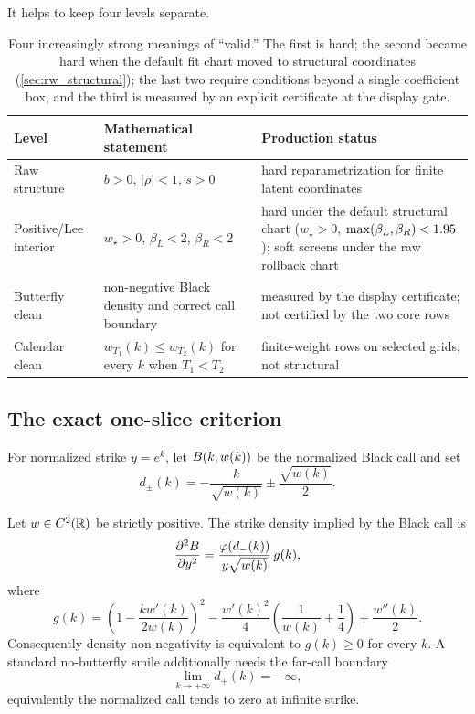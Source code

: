 \documentclass[11pt]{article}
\newcommand{\wmin}{w_\star}
\newcommand{\betL}{\beta_L}
\newcommand{\betR}{\beta_R}
\begin{document}
It helps to keep four levels separate.

\begin{table}[H]
\centering
\small
\begin{tabular}{@{}p{}p{}p{}@{}}
\toprule
Level & Mathematical statement & Production status\\
\midrule
Raw structure & $b>0$, $|\rho|<1$, $s>0$ & hard reparametrization for finite latent coordinates\\
Positive/Lee interior & $\wmin>0$, $\betL<2$, $\betR<2$ & hard under the default structural chart ($\wmin>0$, $\max(\betL,\betR)<\svirwleecap$); soft screens under the raw rollback chart\\
Butterfly clean & non-negative Black density and correct call boundary & measured by the display certificate; not certified by the two core rows\\
Calendar clean & $w_{T_1}(k)\le w_{T_2}(k)$ for every $k$ when $T_1<T_2$ & finite-weight rows on selected grids; not structural\\
\bottomrule
\end{tabular}
\caption{Four increasingly strong meanings of ``valid.''  The first is hard;
the second became hard when the default fit chart moved to structural
coordinates (\cref{sec:rw_structural}); the last two require conditions
beyond a single coefficient box, and the third is measured by an explicit
certificate at the display gate.}
\label{tab:rw_validity}
\end{table}

\subsection{The exact one-slice criterion}

For normalized strike $y=e^k$, let $B(k,w(k))$ be the normalized Black
call and set
\begin{equation}
d_\pm(k)=-\frac{k}{\sqrt{w(k)}}\pm\frac{\sqrt{w(k)}}{2}.
\label{eq:rw_dpm}
\end{equation}

\begin{proposition}
\label{prop:rw_durrleman}
Let $w\in C^2(\mathbb{R})$ be strictly positive.  The strike density implied by the
Black call is
\begin{equation}
\frac{\partial^2B}{\partial y^2}
=\frac{\varphi(d_-(k))}{y\sqrt{w(k)}}\,g(k),
\label{eq:rw_density_factor}
\end{equation}
where
\begin{equation}
g(k)=
\left(1-\frac{k w'(k)}{2w(k)}\right)^2
-\frac{w'(k)^2}{4}\left(\frac{1}{w(k)}+\frac14\right)
+\frac{w''(k)}{2}.
\label{eq:rw_g}
\end{equation}
Consequently density non-negativity is equivalent to $g(k)\ge0$ for every
$k$.  A standard no-butterfly smile additionally needs the far-call boundary
\begin{equation}
\lim_{k\to+\infty}d_+(k)=-\infty,
\label{eq:rw_call_boundary}
\end{equation}
equivalently the normalized call tends to zero at infinite strike.
\end{proposition}
\end{document}
